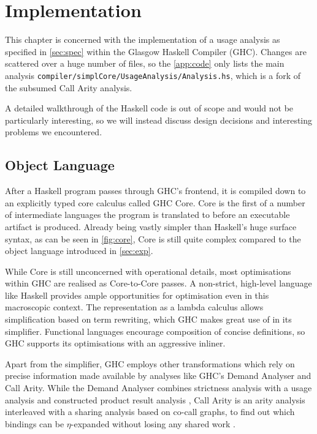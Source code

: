 \chapter{Implementation}\label{sec:impl}

This chapter is concerned with the implementation of a usage analysis as specified in \cref{sec:spec} within the Glasgow Haskell Compiler (GHC).
Changes are scattered over a huge number of files, so the \cref{app:code} only lists the main analysis \texttt{compiler/simplCore/UsageAnalysis/Analysis.hs}, which is a fork of the subsumed Call Arity analysis.

A detailed walkthrough of the Haskell code is out of scope and would not be particularly interesting, so we will instead discuss design decisions and interesting problems we encountered.

\section{Object Language}

After a Haskell program passes through GHC's frontend, it is compiled down to an explicitly typed core calculus called GHC Core. 
Core is the first of a number of intermediate languages the program is translated to before an executable artifact is produced.
Already being vastly simpler than Haskell's huge surface syntax, as can be seen in \cref{fig:core}, Core is still quite complex compared to the object language introduced in \cref{sec:exp}.

While Core is still unconcerned with operational details, most optimisations within GHC are realised as Core-to-Core passes.
A non-strict, high-level language like Haskell provides ample opportunities for optimisation even in this macroscopic context.
The representation as a lambda calculus allows simplification based on term rewriting, which GHC makes great use of in its simplifier.
Functional languages encourage composition of concise definitions, so GHC supports its optimisations with an aggressive inliner.

Apart from the simplifier, GHC employs other transformations which rely on precise information made available by analyses like GHC's Demand Analyser and Call Arity.
While the Demand Analyser combines strictness analysis \parencite{dmd} with a usage analysis \parencite{card} and constructed product result analysis \parencite{cpr}, Call Arity is an arity analysis interleaved with a sharing analysis based on co-call graphs, to find out which bindings can be $\eta$-expanded without losing any shared work .

